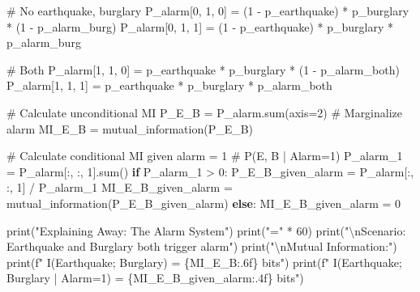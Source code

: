 \documentclass[
  11pt,
  letterpaper,
  oneside,
  openany]{book}
\newenvironment{Shaded}{\begin{snugshade}}{\end{snugshade}}
\newcommand{\BuiltInTok}[1]{\textcolor[rgb]{0.00,0.23,0.31}{#1}}
\newcommand{\CharTok}[1]{\textcolor[rgb]{0.13,0.47,0.30}{#1}}
\newcommand{\CommentTok}[1]{\textcolor[rgb]{0.37,0.37,0.37}{#1}}
\newcommand{\ControlFlowTok}[1]{\textcolor[rgb]{0.00,0.23,0.31}{\textbf{#1}}}
\newcommand{\DecValTok}[1]{\textcolor[rgb]{0.68,0.00,0.00}{#1}}
\newcommand{\NormalTok}[1]{\textcolor[rgb]{0.00,0.23,0.31}{#1}}
\newcommand{\OperatorTok}[1]{\textcolor[rgb]{0.37,0.37,0.37}{#1}}
\newcommand{\SpecialCharTok}[1]{\textcolor[rgb]{0.37,0.37,0.37}{#1}}
\newcommand{\SpecialStringTok}[1]{\textcolor[rgb]{0.13,0.47,0.30}{#1}}
\newcommand{\StringTok}[1]{\textcolor[rgb]{0.13,0.47,0.30}{#1}}
\begin{document}
\begin{Shaded}
\begin{Highlighting}[]
\CommentTok{\# No earthquake, burglary}
\NormalTok{P\_alarm[}\DecValTok{0}\NormalTok{, }\DecValTok{1}\NormalTok{, }\DecValTok{0}\NormalTok{] }\OperatorTok{=}\NormalTok{ (}\DecValTok{1} \OperatorTok{{-}}\NormalTok{ p\_earthquake) }\OperatorTok{*}\NormalTok{ p\_burglary }\OperatorTok{*}\NormalTok{ (}\DecValTok{1} \OperatorTok{{-}}\NormalTok{ p\_alarm\_burg)}
\NormalTok{P\_alarm[}\DecValTok{0}\NormalTok{, }\DecValTok{1}\NormalTok{, }\DecValTok{1}\NormalTok{] }\OperatorTok{=}\NormalTok{ (}\DecValTok{1} \OperatorTok{{-}}\NormalTok{ p\_earthquake) }\OperatorTok{*}\NormalTok{ p\_burglary }\OperatorTok{*}\NormalTok{ p\_alarm\_burg}

\CommentTok{\# Both}
\NormalTok{P\_alarm[}\DecValTok{1}\NormalTok{, }\DecValTok{1}\NormalTok{, }\DecValTok{0}\NormalTok{] }\OperatorTok{=}\NormalTok{ p\_earthquake }\OperatorTok{*}\NormalTok{ p\_burglary }\OperatorTok{*}\NormalTok{ (}\DecValTok{1} \OperatorTok{{-}}\NormalTok{ p\_alarm\_both)}
\NormalTok{P\_alarm[}\DecValTok{1}\NormalTok{, }\DecValTok{1}\NormalTok{, }\DecValTok{1}\NormalTok{] }\OperatorTok{=}\NormalTok{ p\_earthquake }\OperatorTok{*}\NormalTok{ p\_burglary }\OperatorTok{*}\NormalTok{ p\_alarm\_both}

\CommentTok{\# Calculate unconditional MI}
\NormalTok{P\_E\_B }\OperatorTok{=}\NormalTok{ P\_alarm.}\BuiltInTok{sum}\NormalTok{(axis}\OperatorTok{=}\DecValTok{2}\NormalTok{)  }\CommentTok{\# Marginalize alarm}
\NormalTok{MI\_E\_B }\OperatorTok{=}\NormalTok{ mutual\_information(P\_E\_B)}

\CommentTok{\# Calculate conditional MI given alarm = 1}
\CommentTok{\# P(E, B | Alarm=1)}
\NormalTok{P\_alarm\_1 }\OperatorTok{=}\NormalTok{ P\_alarm[:, :, }\DecValTok{1}\NormalTok{].}\BuiltInTok{sum}\NormalTok{()}
\ControlFlowTok{if}\NormalTok{ P\_alarm\_1 }\OperatorTok{\textgreater{}} \DecValTok{0}\NormalTok{:}
\NormalTok{    P\_E\_B\_given\_alarm }\OperatorTok{=}\NormalTok{ P\_alarm[:, :, }\DecValTok{1}\NormalTok{] }\OperatorTok{/}\NormalTok{ P\_alarm\_1}
\NormalTok{    MI\_E\_B\_given\_alarm }\OperatorTok{=}\NormalTok{ mutual\_information(P\_E\_B\_given\_alarm)}
\ControlFlowTok{else}\NormalTok{:}
\NormalTok{    MI\_E\_B\_given\_alarm }\OperatorTok{=} \DecValTok{0}

\BuiltInTok{print}\NormalTok{(}\StringTok{"Explaining Away: The Alarm System"}\NormalTok{)}
\BuiltInTok{print}\NormalTok{(}\StringTok{"="} \OperatorTok{*} \DecValTok{60}\NormalTok{)}
\BuiltInTok{print}\NormalTok{(}\StringTok{"}\CharTok{\textbackslash{}n}\StringTok{Scenario: Earthquake and Burglary both trigger alarm"}\NormalTok{)}
\BuiltInTok{print}\NormalTok{(}\StringTok{"}\CharTok{\textbackslash{}n}\StringTok{Mutual Information:"}\NormalTok{)}
\BuiltInTok{print}\NormalTok{(}\SpecialStringTok{f"  I(Earthquake; Burglary) = }\SpecialCharTok{\{}\NormalTok{MI\_E\_B}\SpecialCharTok{:.6f\}}\SpecialStringTok{ bits"}\NormalTok{)}
\BuiltInTok{print}\NormalTok{(}\SpecialStringTok{f"  I(Earthquake; Burglary | Alarm=1) = }\SpecialCharTok{\{}\NormalTok{MI\_E\_B\_given\_alarm}\SpecialCharTok{:.4f\}}\SpecialStringTok{ bits"}\NormalTok{)}


\end{Highlighting}
\end{Shaded}
\end{document}
